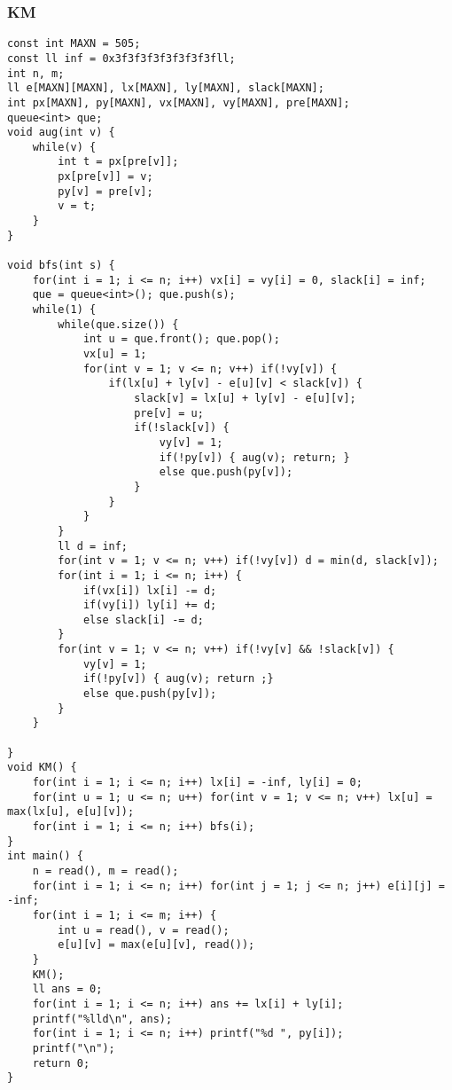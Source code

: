 \documentclass{article}
\begin{document}
   \subsubsection{KM}
\begin{lstlisting}
const int MAXN = 505;
const ll inf = 0x3f3f3f3f3f3f3f3fll;
int n, m;
ll e[MAXN][MAXN], lx[MAXN], ly[MAXN], slack[MAXN];
int px[MAXN], py[MAXN], vx[MAXN], vy[MAXN], pre[MAXN];
queue<int> que;
void aug(int v) {
	while(v) {
		int t = px[pre[v]];
		px[pre[v]] = v;
		py[v] = pre[v];
		v = t;
	}
}

void bfs(int s) {
	for(int i = 1; i <= n; i++) vx[i] = vy[i] = 0, slack[i] = inf;
	que = queue<int>(); que.push(s);
	while(1) {
		while(que.size()) {
			int u = que.front(); que.pop();
			vx[u] = 1;
			for(int v = 1; v <= n; v++) if(!vy[v]) {
				if(lx[u] + ly[v] - e[u][v] < slack[v]) {
					slack[v] = lx[u] + ly[v] - e[u][v];
					pre[v] = u;
					if(!slack[v]) {
						vy[v] = 1;
						if(!py[v]) { aug(v); return; }
						else que.push(py[v]);
					}
				}
			}
		}
		ll d = inf;
		for(int v = 1; v <= n; v++) if(!vy[v]) d = min(d, slack[v]);
		for(int i = 1; i <= n; i++) {
			if(vx[i]) lx[i] -= d;
			if(vy[i]) ly[i] += d;
			else slack[i] -= d;
		}
		for(int v = 1; v <= n; v++) if(!vy[v] && !slack[v]) {
			vy[v] = 1;
			if(!py[v]) { aug(v); return ;}
			else que.push(py[v]);
		}
	}

}
void KM() {
	for(int i = 1; i <= n; i++) lx[i] = -inf, ly[i] = 0;
	for(int u = 1; u <= n; u++) for(int v = 1; v <= n; v++) lx[u] = max(lx[u], e[u][v]);
	for(int i = 1; i <= n; i++) bfs(i);
}
int main() {
	n = read(), m = read();
	for(int i = 1; i <= n; i++) for(int j = 1; j <= n; j++) e[i][j] = -inf;
	for(int i = 1; i <= m; i++) {
		int u = read(), v = read();
		e[u][v] = max(e[u][v], read());
	}
	KM();
	ll ans = 0;
	for(int i = 1; i <= n; i++) ans += lx[i] + ly[i];
	printf("%lld\n", ans);
	for(int i = 1; i <= n; i++) printf("%d ", py[i]);
	printf("\n");
	return 0;
}
\end{lstlisting}   
\end{document}
